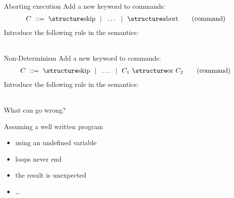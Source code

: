 \documentclass[aspectratio=169]{beamer}
\begin{document}
\begin{slide}{Aborting execution}
Add a new keyword to commands:
\begin{align*}
  C &~::=~ \kw {skip} ~~|~~ \ldots  ~~|~~ \kw{abort}
  \tag{command}\\
\end{align*}
Introduce the following rule in the semantics:\\
%
  {}%
  { \Longrightarrow \bot}
\\[5mm] 
%
  {}%
  { \Longrightarrow {}}
\end{slide}

\begin{slide}{Non-Determinism}
Add a new keyword to commands:
\begin{align*}
  C &~::=~ \kw {skip} ~~|~~ \ldots  ~~|~~ C_1~\kw{or}~C_2
  \tag{command}\\
\end{align*}
Introduce the following rule in the semantics:\\
%
  { \Longrightarrow {}}%
  { \Longrightarrow {}}
\\[5mm]
%
  { \Longrightarrow {}}%
  { \Longrightarrow {}}


\end{slide}


\begin{slide}{What can go wrong?}
  \begin{block}{Assuming a well written program}
    \begin{itemize}
      \item using an undefined variable
      \item loops never end
      \item the result is unexpected
      \item \ldots
    \end{itemize}
  \end{block}
\end{slide}
\end{document}
